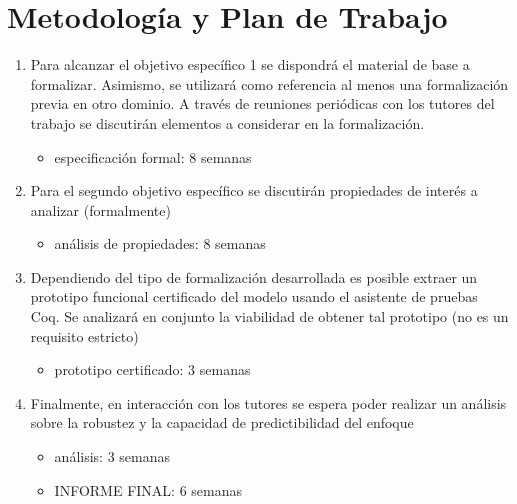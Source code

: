 \documentclass[a4paper,12pt]{article}
\begin{document}
\section{Metodología y Plan de Trabajo}
\begin{enumerate}
    \item Para alcanzar el objetivo específico 1 se dispondrá el material de base a formalizar. Asimismo, se utilizará como referencia al menos una formalización previa en otro dominio. A través de reuniones periódicas con los tutores del trabajo se discutirán elementos a considerar en la formalización.
    \begin{itemize}
        \item especificación formal: 8 semanas
    \end{itemize}
    \item Para el segundo objetivo específico se discutirán propiedades de interés a analizar (formalmente)
    \begin{itemize}
        \item análisis de propiedades: 8 semanas
    \end{itemize}
    \item Dependiendo del tipo de formalización desarrollada es posible extraer un prototipo funcional certificado del modelo usando el asistente de pruebas Coq. Se analizará en conjunto la viabilidad de obtener tal prototipo (no es un requisito estricto)
    \begin{itemize}
        \item prototipo certificado: 3 semanas
    \end{itemize}
    \item Finalmente, en interacción con los tutores se espera poder realizar un análisis sobre la robustez y la capacidad de predictibilidad del enfoque
    \begin{itemize}
        \item análisis: 3 semanas
        \item INFORME FINAL: 6 semanas
    \end{itemize}
\end{enumerate}

\printbibliography
\end{document}
